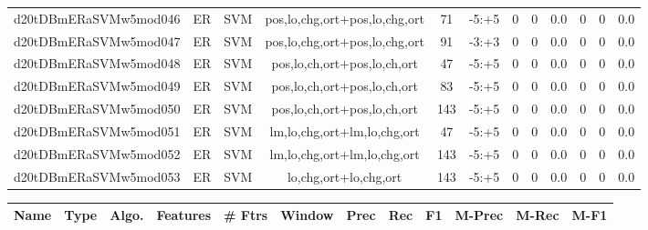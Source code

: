 \documentclass[a4paper]{article}
\begin{document}
\begin{landscape}
\begin{center}
\begin{tabular}{ |c|c|c|c|c|c|c|c|c|c|c|c|}
 
 	
 	\small{ d20tDBmERaSVMw5mod046 } & ER & SVM & pos,lo,chg,ort+pos,lo,chg,ort  &  71 &  -5:+5  &  0 & 0 & 0.0  &  0 & 0 & 0.0 \\
 	

 
 	
 	\small{ d20tDBmERaSVMw5mod047 } & ER & SVM & pos,lo,chg,ort+pos,lo,chg,ort  &  91 &  -3:+3  &  0 & 0 & 0.0  &  0 & 0 & 0.0 \\
 	

 
 	
 	\small{ d20tDBmERaSVMw5mod048 } & ER & SVM & pos,lo,ch,ort+pos,lo,ch,ort  &  47 &  -5:+5  &  0 & 0 & 0.0  &  0 & 0 & 0.0 \\
 	

 
 	
 	\small{ d20tDBmERaSVMw5mod049 } & ER & SVM & pos,lo,ch,ort+pos,lo,ch,ort  &  83 &  -5:+5  &  0 & 0 & 0.0  &  0 & 0 & 0.0 \\
 	

 
 	
 	\small{ d20tDBmERaSVMw5mod050 } & ER & SVM & pos,lo,ch,ort+pos,lo,ch,ort  &  143 &  -5:+5  &  0 & 0 & 0.0  &  0 & 0 & 0.0 \\
 	

 
 	
 	\small{ d20tDBmERaSVMw5mod051 } & ER & SVM & lm,lo,chg,ort+lm,lo,chg,ort  &  47 &  -5:+5  &  0 & 0 & 0.0  &  0 & 0 & 0.0 \\
 	

 
 	
 	\small{ d20tDBmERaSVMw5mod052 } & ER & SVM & lm,lo,chg,ort+lm,lo,chg,ort  &  143 &  -5:+5  &  0 & 0 & 0.0  &  0 & 0 & 0.0 \\
 	

 
 	
 	\small{ d20tDBmERaSVMw5mod053 } & ER & SVM & lo,chg,ort+lo,chg,ort  &  143 &  -5:+5  &  0 & 0 & 0.0  &  0 & 0 & 0.0 \\
 	
 \hline
\end{tabular}
\end{center}




\begin{center}
\begin{tabular}{ |c|c|c|c|c|c|c|c|c|c|c|c|} 
 \hline
 	Name & Type & Algo. & Features & \# Ftrs & Window & Prec & Rec & F1 & M-Prec & M-Rec & M-F1\\
 \hline

 	

 
 	

\end{tabular}
\end{center}
\end{landscape}
\end{document}
